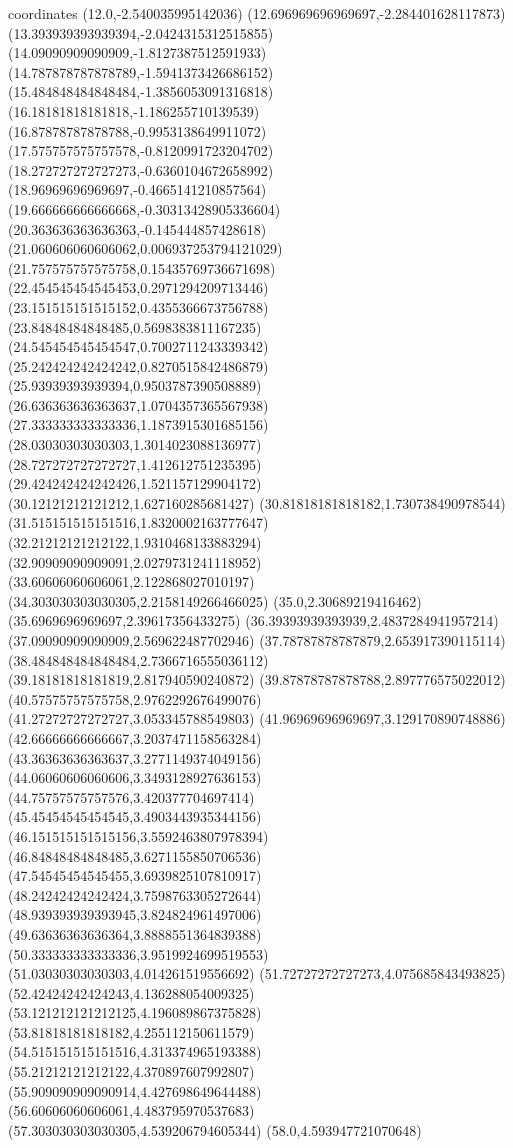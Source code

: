 coordinates {%
(12.0,-2.540035995142036)
(12.696969696969697,-2.284401628117873)
(13.393939393939394,-2.0424315312515855)
(14.09090909090909,-1.8127387512591933)
(14.787878787878789,-1.5941373426686152)
(15.484848484848484,-1.3856053091316818)
(16.18181818181818,-1.186255710139539)
(16.87878787878788,-0.9953138649911072)
(17.575757575757578,-0.8120991723204702)
(18.272727272727273,-0.6360104672658992)
(18.96969696969697,-0.4665141210857564)
(19.666666666666668,-0.30313428905336604)
(20.363636363636363,-0.145444857428618)
(21.060606060606062,0.006937253794121029)
(21.757575757575758,0.15435769736671698)
(22.454545454545453,0.2971294209713446)
(23.151515151515152,0.4355366673756788)
(23.84848484848485,0.5698383811167235)
(24.545454545454547,0.7002711243339342)
(25.242424242424242,0.8270515842486879)
(25.93939393939394,0.9503787390508889)
(26.636363636363637,1.0704357365567938)
(27.333333333333336,1.1873915301685156)
(28.03030303030303,1.3014023088136977)
(28.727272727272727,1.412612751235395)
(29.424242424242426,1.521157129904172)
(30.12121212121212,1.627160285681427)
(30.81818181818182,1.730738490978544)
(31.515151515151516,1.8320002163777647)
(32.21212121212122,1.9310468133883294)
(32.90909090909091,2.0279731241118952)
(33.60606060606061,2.122868027010197)
(34.303030303030305,2.2158149266466025)
(35.0,2.30689219416462)
(35.6969696969697,2.39617356433275)
(36.39393939393939,2.4837284941957214)
(37.09090909090909,2.569622487702946)
(37.78787878787879,2.653917390115114)
(38.484848484848484,2.7366716555036112)
(39.18181818181819,2.817940590240872)
(39.87878787878788,2.897776575022012)
(40.57575757575758,2.9762292676499076)
(41.27272727272727,3.053345788549803)
(41.96969696969697,3.129170890748886)
(42.66666666666667,3.2037471158563284)
(43.36363636363637,3.2771149374049156)
(44.06060606060606,3.3493128927636153)
(44.75757575757576,3.420377704697414)
(45.45454545454545,3.4903443935344156)
(46.151515151515156,3.5592463807978394)
(46.84848484848485,3.6271155850706536)
(47.54545454545455,3.6939825107810917)
(48.24242424242424,3.7598763305272644)
(48.939393939393945,3.824824961497006)
(49.63636363636364,3.8888551364839388)
(50.333333333333336,3.9519924699519553)
(51.03030303030303,4.014261519556692)
(51.72727272727273,4.075685843493825)
(52.42424242424243,4.136288054009325)
(53.121212121212125,4.196089867375828)
(53.81818181818182,4.255112150611579)
(54.515151515151516,4.313374965193388)
(55.21212121212122,4.370897607992807)
(55.909090909090914,4.427698649644488)
(56.60606060606061,4.483795970537683)
(57.303030303030305,4.539206794605344)
(58.0,4.593947721070648)
}
